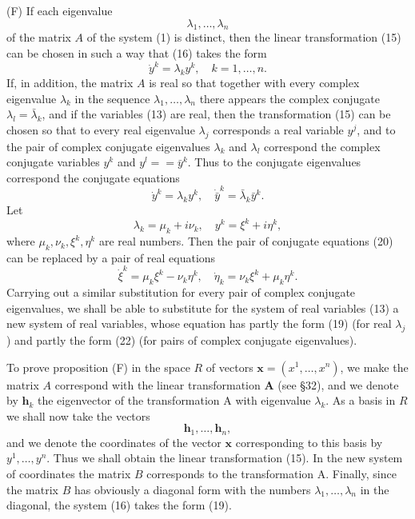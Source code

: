 \documentclass[10pt,a5paper]{book}
\theoremstyle{plain}
\theoremstyle{definition}
\theoremstyle{remark}
\begin{document}
(F) If each eigenvalue
\[
\lambda_{1}, \ldots, \lambda_{n}
\]
of the matrix $A$ of the system (1) is distinct, then the linear transformation (15) can be chosen in such a way that (16) takes the form
\begin{equation*}
\dot{y}^{k}=\lambda_{k} y^{k}, \quad k=1, \ldots, n . \tag{19}
\end{equation*}
If, in addition, the matrix $A$ is real so that together with every complex eigenvalue $\lambda_{k}$ in the sequence $\lambda_{1}, \ldots, \lambda_{n}$ there appears the complex conjugate $\lambda_{l}=\bar{\lambda}_{k}$, and if the variables (13) are real, then the transformation (15) can be chosen so that to every real eigenvalue $\lambda_{j}$ corresponds a real variable $y^{j}$, and to the pair of complex conjugate eigenvalues $\lambda_{k}$ and $\lambda_{l}$ correspond the complex conjugate variables $y^{k}$ and $y^{l}==\bar{y}^{k}$. Thus to the conjugate eigenvalues correspond the conjugate equations
\begin{equation*}
\dot{y}^{k}=\lambda_{k} y^{k}, \quad \dot{\bar{y}}^{k}=\bar{\lambda}_{k} \bar{y}^{k} . \tag{20}
\end{equation*}
Let
\begin{equation*}
\lambda_{k}=\mu_{k}+i \nu_{k}, \quad y^{k}=\xi^{k}+i \eta^{k}, \tag{21}
\end{equation*}
where $\mu_{k}, \nu_{k}, \xi^{k}, \eta^{k}$ are real numbers. Then the pair of conjugate equations (20) can be replaced by a pair of real equations
\begin{equation*}
\dot{\xi}^{k}=\mu_{k} \xi^{k}-\nu_{k} \eta^{k}, \quad \dot{\eta}_{k}=\nu_{k} \xi^{k}+\mu_{k} \eta^{k} . \tag{22}
\end{equation*}
Carrying out a similar substitution for every pair of complex conjugate eigenvalues, we shall be able to substitute for the system of real variables (13) a new system of real variables, whose equation has partly the form (19) (for real $\lambda_{j}$ ) and partly the form (22) (for pairs of complex conjugate eigenvalues).

To prove proposition (F) in the space $R$ of vectors $\mathbf{x}=\left(x^{1}, \ldots, x^{n}\right)$, we make the matrix $A$ correspond with the linear transformation $\mathbf{A}$ (see §32), and we denote by $\mathbf{h}_{k}$ the eigenvector of the transformation A with eigenvalue $\lambda_{k}$. As a basis in $R$ we shall now take the vectors
\begin{equation*}
\mathbf{h}_{1}, \ldots, \mathbf{h}_{n}, \tag{23}
\end{equation*}
and we denote the coordinates of the vector $\mathbf{x}$ corresponding to this basis by $y^{1}, \ldots, y^{n}$. Thus we shall obtain the linear transformation (15). In the new system of coordinates the matrix $B$ corresponds to the transformation A. Finally, since the matrix $B$ has obviously a diagonal form with the numbers $\lambda_{1}, \ldots, \lambda_{n}$ in the diagonal, the system (16) takes the form (19).
\end{document}
